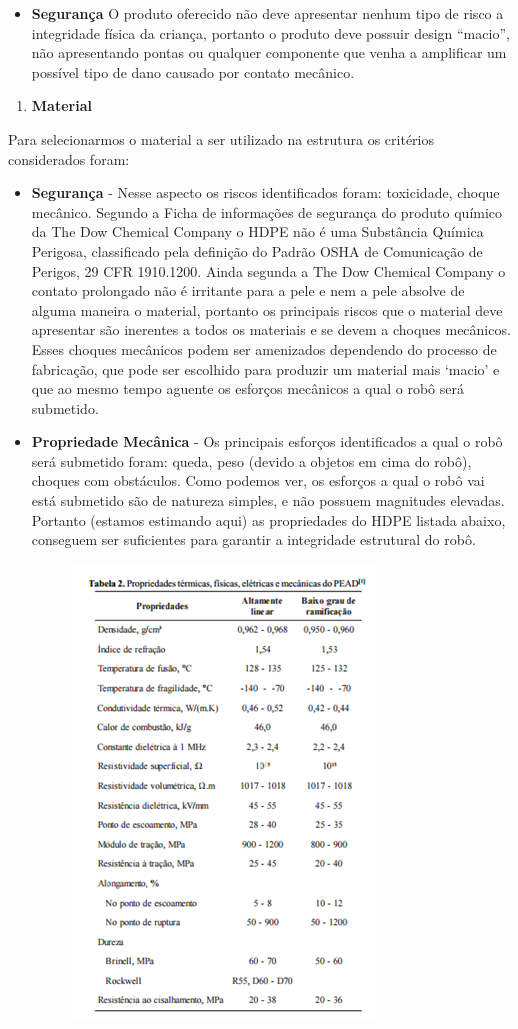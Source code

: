 \begin{itemize}
  \item \textbf{Segurança} O produto oferecido não deve apresentar nenhum tipo de risco a integridade física da criança, portanto o produto deve possuir design “macio”, não apresentando pontas ou qualquer componente que venha a amplificar um possível tipo de dano causado por contato mecânico.
\end{itemize}

\begin{enumerate}
  \item \textbf{Material} 
\end{enumerate}

Para selecionarmos o material a ser utilizado na estrutura os critérios considerados foram:

\begin{itemize}
  \item \textbf{Segurança} - Nesse aspecto os riscos identificados foram: toxicidade, choque mecânico.
  Segundo a Ficha de informações de segurança do produto químico da The Dow Chemical Company o HDPE não é uma Substância Química Perigosa, classificado pela definição do Padrão OSHA de Comunicação de Perigos, 29 CFR 1910.1200. Ainda segunda a The Dow Chemical Company o contato prolongado não é irritante para a pele e nem a pele absolve de alguma maneira o material, portanto os principais riscos que o material deve apresentar são inerentes a todos os materiais e se devem a choques mecânicos. Esses choques mecânicos podem ser amenizados dependendo do processo de fabricação, que pode ser escolhido para produzir um material mais ‘macio’ e que ao mesmo tempo aguente os esforços mecânicos a qual o robô será submetido.
  \item \textbf{Propriedade Mecânica} - Os principais esforços identificados a qual o robô será submetido foram: queda, peso (devido a objetos em cima do robô), choques com obstáculos.
  Como podemos ver, os esforços a qual o robô vai está submetido são de natureza simples, e não possuem magnitudes elevadas. Portanto (estamos estimando aqui) as propriedades do HDPE listada abaixo, conseguem ser suficientes para garantir a integridade estrutural do robô.
  \begin{figure}[H]
    \centering
    \includegraphics[width=.5\textwidth]{edit/img/especificacao.png}

\end{figure}
\end{itemize}
